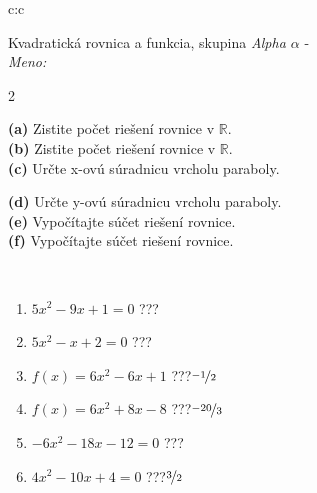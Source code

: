 \documentclass[10pt]{report}
\begin{document}
\thispagestyle{empty}
\begin{tabular}{c:c}
\begin{minipage}[c][104.5mm][t]{0.5\linewidth}
\begin{center}
\vspace{7mm}
{\huge {\LARGE Kvadratická rovnica a funkcia}, skupina \textit{Alpha $\alpha$} -}\\[5mm]
\textit{Meno:}\phantom{xxxxxxxxxxxxxxxxxxxxxxxxxxxxxxxxxxxxxxxxxxxxxxxxxxxxxxxxxxxxxxxxx}\\[5mm]
\begin{minipage}{0.95\linewidth}
\begin{center}
{\small \begin{multicols}{2} \raggedright
\textbf{(a)} Zistite počet riešení rovnice v \(\mathbb{R}\). \\[1mm]
\textbf{(b)} Zistite počet riešení rovnice v \(\mathbb{R}\). \\[1mm]
\textbf{(c)} Určte x-ovú súradnicu vrcholu paraboly. \par \columnbreak
\textbf{(d)} Určte y-ovú súradnicu vrcholu paraboly. \\[1mm]
\textbf{(e)} Vypočítajte súčet riešení rovnice. \\[1mm]
\textbf{(f)} Vypočítajte súčet riešení rovnice.
\end{multicols}
}
\end{center}
\end{minipage}
\\[4mm]
\begin{minipage}{0.79\linewidth}
\begin{center}
\begin{varwidth}{\linewidth}
\begin{enumerate}
\Large
\item $5x^2-9x+1=0$\quad \dotfill\; ???\;\dotfill {}
\item $5x^2-x+2=0$\quad \dotfill\; ???\;\dotfill {}
\item $f(x)=6x^2-6x+1$\quad \dotfill\; ???\;\dotfill \quad $\nicefrac{-1}{2}$
\item $f(x)=6x^2+8x-8$\quad \dotfill\; ???\;\dotfill \quad $\nicefrac{-20}{3}$
\item $-6x^2-18x-12=0$\quad \dotfill\; ???\;\dotfill {}
\item $4x^2-10x+4=0$\quad \dotfill\; ???\;\dotfill \quad $\nicefrac{3}{2}$
\end{enumerate}
\end{varwidth}
\end{center}

\end{minipage}
\end{center}
\end{minipage}
\end{tabular}
\end{document}
